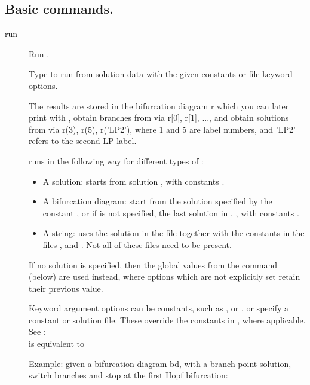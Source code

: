 \documentclass[12pt]{report}
\begin{document}
\subsection{Basic commands.} \label{sec:clui_ref_basic}
\begin{description}
\item[run]
Run \AUTO.

    Type  to run \AUTO from solution data with the given
    \AUTO constants or file keyword options.
    
    The results are stored in the bifurcation diagram r which you can
    later print with , obtain branches from via r[0], r[1], ...,
    and obtain solutions from via r(3), r(5), r('LP2'), where 1 and 5
    are label numbers, and 'LP2' refers to the second LP label.

     runs \AUTO in the following way for different types of :
    \begin{itemize}
    \item
      A solution: \AUTO starts from solution , with \AUTO constants .
    \item
      A bifurcation diagram: \AUTO start from the solution specified by
      the \AUTO constant , or if  is not specified, the last solution
      in , , with \AUTO constants .
    \item
      A string: \AUTO uses the solution in the file  together with the
      constants in the files , and . Not all of these
      files need to be present.
    \end{itemize}

    If no solution  is specified, then the global values from the
     command (below) are used instead, where
    options which are not explicitly set retain their previous value.

    Keyword argument options can be \AUTO constants, such as ,
    or , or specify a constant or solution file. These override
    the constants in , where applicable. See :\\
     is equivalent to 

    Example: given a bifurcation diagram bd, with a branch point
    solution, switch branches and stop at the first Hopf bifurcation:\\
    

\end{description}
\end{document}
